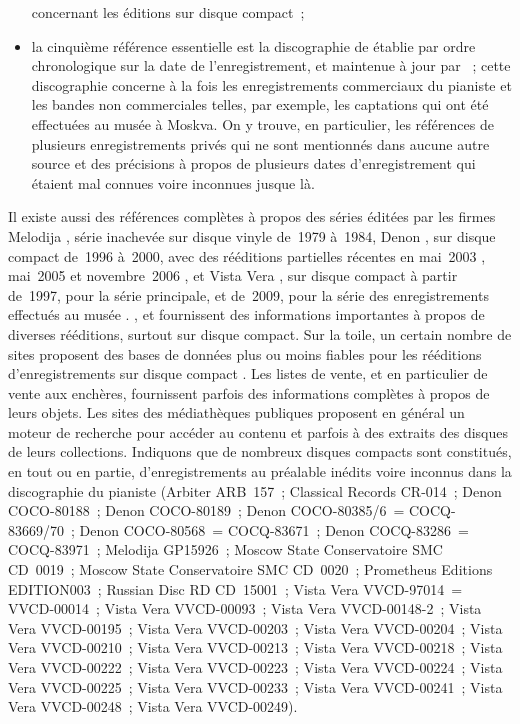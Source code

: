 \begin{itemize}
 concernant les éditions sur disque compact~;
 \item
 la cinquième référence essentielle est la discographie de \VSofronitsky{}
 établie par ordre chronologique sur la date de l'enregistrement, et
 maintenue à jour par \CJohansson{} \citep[voir][]{Johansson}~; cette
 discographie concerne à la fois les enregistrements commerciaux du pianiste
 et les bandes non commerciales telles, par exemple, les captations qui ont
 été effectuées au musée \Scriabine{} à Moskva.
 On y trouve, en particulier, les références de plusieurs enregistrements
 privés qui ne sont mentionnés dans aucune autre source et des précisions à
 propos de plusieurs dates d'enregistrement qui étaient mal connues voire
 inconnues jusque là.
\end{itemize}

Il existe aussi des références complètes à propos des séries éditées par les
firmes Melodija \citep[voir][]{Malik, Masuda, Nikonovich11, White}, série
inachevée sur disque vinyle de~1979 à~1984, Denon \citep[voir][]{Denon03,
Denon05, Denon06}, sur disque compact de~1996 à~2000, avec des rééditions
partielles récentes en mai~2003 \citep{Denon03}, mai~2005 \citep{Denon05} et
novembre~2006 \citep{Denon06}, et Vista Vera \citep[voir][]{VistaVera}, sur
disque compact à partir de~1997, pour la série principale, et de~2009, pour
la série des enregistrements effectués au musée \Scriabine{}.
\HFogel{} \citep[voir][]{Fogel}, \SGraham{} \citep[voir][]{Graham} et
\PTaylor{} \citep[voir][]{Taylor} fournissent des informations importantes à
propos de diverses rééditions, surtout sur disque compact.
Sur la toile, un certain nombre de sites proposent des bases de données plus
ou moins fiables pour les rééditions d'enregistrements sur disque compact
\citep[voir][]{Discogs.com, Freedb.org, Gracenote.com}.
Les listes de vente, et en particulier de vente aux enchères, fournissent
parfois des informations complètes à propos de leurs objets.
Les sites des médiathèques publiques proposent en général un moteur de
recherche pour accéder au contenu et parfois à des extraits des disques de
leurs collections.
Indiquons que de nombreux disques compacts sont constitués, en tout ou en
partie, d'enregistrements au préalable inédits voire inconnus dans la
discographie du pianiste (Arbiter ARB~157~; Classical Records CR-014~; Denon
COCO-80188~; Denon COCO-80189~; Denon COCO-80385/6~= COCQ-83669/70~; Denon
COCO-80568~= COCQ-83671~; Denon COCQ-83286~= COCQ-83971~; Melodija GP15926~;
Moscow State Conservatoire SMC CD~0019~; Moscow State Conservatoire SMC
CD~0020~; Prometheus Editions EDITION003~; Russian Disc RD CD~15001~; Vista
Vera VVCD-97014~= VVCD-00014~; Vista Vera VVCD-00093~; Vista Vera
VVCD-00148-2~; Vista Vera VVCD-00195~; Vista Vera VVCD-00203~; Vista Vera
VVCD-00204~; Vista Vera VVCD-00210~; Vista Vera VVCD-00213~; Vista Vera
VVCD-00218~; Vista Vera VVCD-00222~; Vista Vera VVCD-00223~; Vista Vera
VVCD-00224~; Vista Vera VVCD-00225~; Vista Vera VVCD-00233~; Vista Vera
VVCD-00241~; Vista Vera VVCD-00248~; Vista Vera VVCD-00249).

